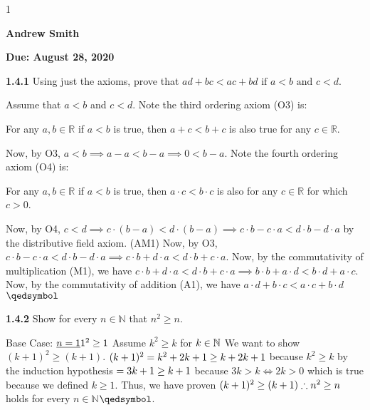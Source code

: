 \documentclass[12pt]{article}
\newcommand{\duedate}{August 28, 2020}
\newcommand{\yourname}{Andrew Smith}
\def\printsolutions{1}
\newcommand{\N}{\mathbb{N}}
\newcommand{\R}{\mathbb{R}}
\begin{document}
\if\printsolutions1
\begin{center}
\textbf{\Large \yourname}
\end{center}
\else
\begin{center}
\textbf{\Large Due: \duedate}
\end{center}
\fi


\begin{problem}\textbf{1.4.1}
Using just the axioms, prove that $ad+bc<ac+bd\text{ if } a<b\text{ and } c<d$.
\end{problem}
\begin{solution}\newline
Assume that $a<b$ and $c<d$.\newline 
Note the third ordering axiom (O3) is:
\begin{center}
    For any $a,b\in\R$ if $a<b$ is true, then $a+c<b+c$ is also true for any $c\in\R$. 
\end{center}
Now, by O3, $a<b \implies a-a<b-a\implies 0<b-a.$\newline
Note the fourth ordering axiom (O4) is:
\begin{center}
    For any $a,b\in\R$ if $a<b$ is true, then $a\cdot c<b\cdot c$ is also for any $c\in\R$ for which $c>0$.
\end{center}
Now, by O4, $c<d\implies c\cdot(b-a)<d\cdot(b-a)\implies c\cdot b - c\cdot a < d\cdot b-d
\cdot a$ by the distributive field axiom. (AM1)\newline
Now, by O3, $c\cdot b-c\cdot a<d\cdot b-d\cdot a\implies c\cdot b+d\cdot a<d\cdot b+c\cdot a$.\newline
Now, by the commutativity of multiplication (M1), we have $c\cdot b+d\cdot a<d\cdot b+c\cdot a\implies b\cdot b+a\cdot d<b\cdot d+a\cdot c$.\newline
Now, by the commutativity of addition (A1), we have $a\cdot d+b\cdot c<a\cdot c+b\cdot d$\flushright $\qedsymbol$
\end{solution}
\begin{problem}\textbf{1.4.2}
Show for every $n\in\N$ that $n^2\geq n$.
\end{problem}
\begin{solution}\newline
Base Case:\newline
$\underline{n=1}\newline
1^2\geq 1$\newline
Assume $k^2\geq k$ for $k\in\N\newline$
We want to show $(k+1)^2\geq(k+1)$.\newline
$(k+1)^2=k^2+2k+1\newline
\geq k+2k+1$ because $k^2\geq k$ by the induction hypothesis\newline
$=3k+1\newline
\geq k+1$ because $3k>k \iff 2k>0$ which is true because we defined $k\geq 1$.\newline
Thus, we have proven $(k+1)^2\geq(k+1)\newline
\therefore n^2\geq n$ holds for every $n\in\N$\flushright$\qedsymbol$.
\end{solution}
\end{document}

